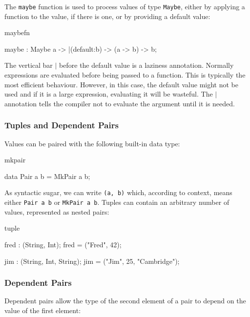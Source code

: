 The \texttt{maybe} function is used to process values of type \texttt{Maybe}, 
either by applying a function to the value, if there is one, or by providing a default value:

\begin{SaveVerbatim}{maybefn}

maybe : Maybe a -> |(default:b) -> (a -> b) -> b;

\end{SaveVerbatim}

The vertical bar $\mid$ before the default value is a laziness annotation. Normally
expressions are evaluated before being passed to a function. This is typically
the most efficient behaviour. However, in this case, the default value might
not be used and if it is a large expression, evaluating it will be wasteful.
The $\mid$ annotation tells the compiler not to evaluate the argument until it is
needed.

\subsubsection{Tuples and Dependent Pairs}

Values can be paired with the following built-in data type:

\begin{SaveVerbatim}{mkpair}

data Pair a b = MkPair a b;

\end{SaveVerbatim}

As syntactic sugar, we can write \texttt{(a, b)} which, according to context,
means either \texttt{Pair a b} or \texttt{MkPair a b}.
Tuples can contain an arbitrary number of values, represented as nested pairs:

\begin{SaveVerbatim}{tuple}

fred : (String, Int);
fred = ("Fred", 42);

jim : (String, Int, String);
jim = ("Jim", 25, "Cambridge");

\end{SaveVerbatim}

\subsubsection*{Dependent Pairs}

Dependent pairs allow the type of the second element of a pair to depend on
the value of the first element:

